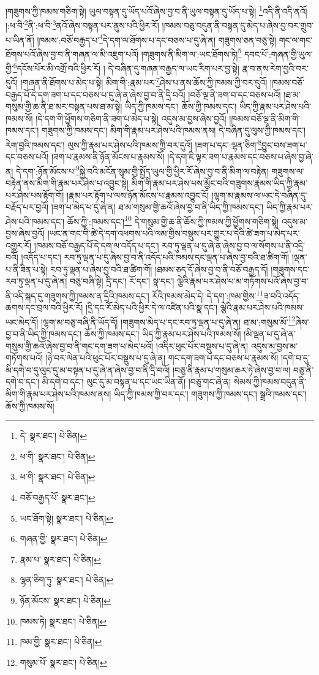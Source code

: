 །གཟུགས་ཀྱི་ཁམས་གཅིག་སྟེ། ཡུལ་བསྟན་དུ་ཡོད་པའོ་ཞེས་བྱ་བ་ནི་ཡུལ་བསྟན་དུ་ཡོད་པ་སྟེ། \footnote{དེ་  སྣར་ཐང་།  པེ་ཅིན། }འདི་ནི་འདི་ནའོ། །:ཕ་བི་\footnote{ཕ་གི་  སྣར་ཐང་།  པེ་ཅིན། }ནི་:ཕ་བི་\footnote{ཕ་གི་  སྣར་ཐང་།  པེ་ཅིན། }ནའོ་ཞེས་བསྟན་པར་ནུས་པའི་ཕྱིར་རོ། །ཁམས་བཅུ་བདུན་ནི་བསྟན་དུ་མེད་པ་ཞེས་བྱ་བར་གྲུབ་པ་ཡིན་ནོ། །ཁམས་:བཅོ་བརྒྱད་པ་\footnote{བཅོ་བརྒྱད་པོ་  སྣར་ཐང་། }དེ་དག་ལ་ཐོགས་པ་དང་བཅས་པ་དུ་ཞེ་ན། གཟུགས་ཅན་བཅུ་སྟེ། གང་ལ་གང་ཐོགས་པའོ་ཞེས་བྱ་བ་ནི་གཞན་ལ་མི་འཇུག་པའོ། །གཟུགས་ནི་མིག་ལ་:ཡང་ཐོགས་ཏེ།\footnote{ཡང་ཐོག་སྟེ།  སྣར་ཐང་།  པེ་ཅིན། } དབང་པོ་:གཞན་གྱི་ཡུལ་གྱི་\footnote{གཞན་གྱི་  སྣར་ཐང་།  པེ་ཅིན། }དངོས་པོར་མི་འགྲོ་བའི་ཕྱིར་རོ། །
དེ་བཞིན་དུ་གཞན་བརྒྱད་ལ་ཡང་རིག་པར་བྱ་སྟེ། རྣ་བ་ནས་རེག་བྱའི་བར་དུའོ། །གཞན་ནི་ཐོགས་པ་མེད་པ་སྟེ། མིག་གི་:རྣམ་པར་\footnote{རྣམ་པ་  སྣར་ཐང་།  པེ་ཅིན། }ཤེས་པ་ནས་ཆོས་ཀྱི་ཁམས་ཀྱི་བར་དུའོ། །ཁམས་བཅོ་བརྒྱད་པོ་དེ་དག་ཟག་པ་དང་བཅས་པ་དུ་ཞེ་ན་ཞེས་བྱ་བ་ནི་དྲི་བའོ། །བཅོ་ལྔ་ནི་ཟག་བ་དང་བཅས་པའོ། །ཐ་མ་གསུམ་གྱི་ཆ་ནི་ཐ་མར་བསྟན་པས་ཐ་མ་སྟེ། ཡིད་ཀྱི་ཁམས་དང་། ཆོས་ཀྱི་ཁམས་དང་། ཡིད་ཀྱི་རྣམ་པར་ཤེས་པའི་ཁམས་སོ། །དེ་དག་གི་ཕྱོགས་གཅིག་ནི་ཟག་པ་མེད་པ་སྟེ། འདུས་མ་བྱས་ཞེས་བྱའོ། །ཁམས་བཅོ་ལྔ་ནི་མིག་གི་ཁམས་དང་། གཟུགས་ཀྱི་ཁམས་དང་། མིག་གི་རྣམ་པར་ཤེས་པའི་ཁམས་ནས། དེ་བཞིན་དུ་ལུས་ཀྱི་ཁམས་དང་། རེག་བྱའི་ཁམས་དང་། ལུས་ཀྱི་རྣམ་པར་ཤེས་པའི་ཁམས་ཀྱི་བར་དུའོ། །ཟག་པ་དང་:ལྷན་ཅིག་\footnote{ལྷན་ཅིག་ཏུ་  སྣར་ཐང་།  པེ་ཅིན། }བྱུང་བས་ཟག་པ་དང་བཅས་པའོ། །ཟག་པ་རྣམས་ནི་ཉོན་མོངས་པ་རྣམས་སོ། །དེ་དག་ཇི་ལྟར་ཟག་པ་རྣམས་དང་བཅས་པ་ཞེས་བྱ་ཞེ་ན། དེ་དག་:ཉོན་མོངས་པ་\footnote{ཉོན་མོངས་  སྣར་ཐང་།  པེ་ཅིན། }སྐྱེ་བའི་མངོན་སུམ་གྱི་སྤྱོད་ཡུལ་གྱི་ཕྱིར་རོ་ཞེས་བྱ་བ་ནི་མིག་ལ་བརྟེན། གཟུགས་ལ་བརྟེན་ནས་མིག་གི་རྣམ་པར་ཤེས་པ་འབྱུང་སྟེ། མིག་གི་རྣམ་པར་ཤེས་པས་མྱོང་བའི་གཟུགས་རྣམས་ཡིད་ཀྱི་རྣམ་པར་ཤེས་པས་རྟོག་གོ། །རྣམ་པར་རྟོག་པ་ལས་ཉོན་མོངས་པ་རྣམས་འབྱུང་ངོ། །ལྷག་མ་རྣམས་ལ་ཡང་དེ་བཞིན་དུ་བརྗོད་པར་བྱའོ། །ཟག་པ་མེད་པ་དུ་ཞེ་ན། ཐ་མ་གསུམ་གྱི་ཆའོ་ཞེས་བྱ་བ་ནི་ཡིད་ཀྱི་ཁམས་དང་། ཡིད་ཀྱི་རྣམ་པར་ཤེས་པའི་ཁམས་དང་། ཆོས་ཀྱི་:ཁམས་དང་།\footnote{ཁམས་ཏེ།  སྣར་ཐང་།  པེ་ཅིན། } དེ་གསུམ་གྱི་ཆ་ནི་ཆོས་ཀྱི་ཁམས་ཀྱི་ཕྱོགས་གཅིག་སྟེ། འདུས་མ་བྱས་ཞེས་བྱའོ། །ཡང་ན་གང་གི་ཚེ་དེ་དག་འཕགས་པའི་ལམ་གྱིས་བསྡུས་པར་གྱུར་པ་དེའི་ཚེ་ཟག་པ་མེད་པར་འགྱུར་རོ། །ཁམས་བཅོ་བརྒྱད་པོ་དེ་དག་ལ་འདོད་པ་དང་། རབ་ཏུ་ལྡན་པ་དུ་ཞེ་ན་ཞེས་བྱ་བ་ལ་སོགས་པ་ནི་འདྲི་བའོ། །འདོད་པ་དང་། རབ་ཏུ་ལྡན་པ་དུ་ཞེས་བྱ་བ་ནི་འདོད་པའི་ཁམས་དང་ལྡན་པ་ཞེས་བྱ་བའི་ཐ་ཚིག་གོ། །ལྡན་པ་ནི་ཟིན་པ་སྟེ། རབ་ཏུ་ལྡན་པ་ཞེས་བྱ་བའི་ཐ་ཚིག་གོ། །ཐམས་ཅད་དོ་ཞེས་བྱ་བ་ནི་བཅོ་བརྒྱད་དོ། །གཟུགས་དང་རབ་ཏུ་ལྡན་པ་དུ་ཞེ་ན། བཅུ་བཞི་སྟེ། དྲི་དང་། རོ་དང་། སྣ་དང་། ལྕེའི་རྣམ་པར་ཤེས་པ་མ་གཏོགས་པའོ་ཞེས་བྱ་བ་ནི་འདི་སྐད་དུ་གཟུགས་ཀྱི་ཁམས་ན་དྲིའི་ཁམས་དང་། རོའི་ཁམས་མེད་དེ། དེ་དག་:ཁམ་གྱིས་\footnote{ཁམ་གྱི་  སྣར་ཐང་།  པེ་ཅིན། }ཟ་བའི་འདོད་ཆགས་དང་བྲལ་བའི་ཕྱིར་རོ། །དྲི་དང་རོ་མེད་པའི་ཕྱིར་དེ་ལ་འཛིན་པའི་སྣ་དང་། ལྕེའི་རྣམ་པར་ཤེས་པའི་ཁམས་ཡང་མེད་དོ། །ལྷག་མ་བཅུ་བཞི་ནི་ཡོད་དོ། །གཟུགས་མེད་པ་དང་རབ་ཏུ་ལྡན་པ་དུ་ཞེ་ན། ཐ་མ་:གསུམ་མོ་\footnote{གསུམ་པོ་  སྣར་ཐང་།  པེ་ཅིན། }ཞེས་བྱ་བ་ནི་ཡིད་ཀྱི་ཁམས་དང་། ཆོས་ཀྱི་ཁམས་དང་། ཡིད་ཀྱི་རྣམ་པར་ཤེས་པའི་ཁམས་སོ། །མི་ལྡན་པ་དུ་ཞེ་ན་གསུམ་གྱི་ཆའོ་ཞེས་བྱ་བ་ནི་གང་དག་ཟག་པ་མེད་པའོ། །འདིར་ཕུང་པོར་བསྡུས་པ་དུ་ཞེ་ན། འདུས་མ་བྱས་མ་གཏོགས་པའོ། །ཉེ་བར་ལེན་པའི་ཕུང་པོར་བསྡུས་པ་དུ་ཞེ་ན། གང་དག་ཟག་པ་དང་བཅས་པ་རྣམས་སོ། །དགེ་བ་དུ་མི་དགེ་བ་དུ་ལུང་དུ་མ་བསྟན་པ་དུ་ཞེ་ན་ཞེས་བྱ་བ་ནི་དྲི་བའོ། །བཅུ་ནི་རྣམ་པ་གསུམ་ཆར་ཏེ་ཞེས་བྱ་བ་ལ། བཅུ་ནི་དགེ་བ་དང་། མི་དགེ་བ་དང་། ལུང་དུ་མ་བསྟན་པ་དང་ཡང་ཡིན་ནོ། །བཅུ་གང་ཞེ་ན། སེམས་ཀྱི་ཁམས་བདུན་ནི་མིག་གི་རྣམ་པར་ཤེས་པའི་ཁམས་ནས། ཡིད་ཀྱི་ཁམས་ཀྱི་བར་དང་། གཟུགས་ཀྱི་ཁམས་དང་། སྒྲའི་ཁམས་དང་། ཆོས་ཀྱི་ཁམས་སོ། 